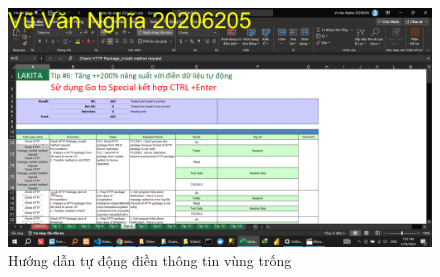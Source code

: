 \documentclass{article}
\begin{document}
\begin{figure}[h]
    \centering
    \includegraphics[scale = 0.15]{Video3/HuongDan/1.png}
    \caption{Hướng dẫn tự động điền thông tin vùng trống}
\end{figure}







\end{document}
